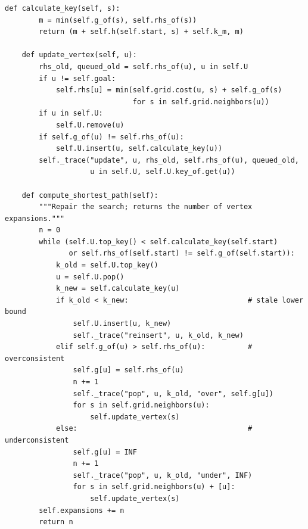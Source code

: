 \begin{lstlisting}[caption={\cref{alg:ch05-dstarlite} line by line: key, \protect\DslUpdateVertex and \protect\DslComputeShortestPath of class \code{DStarLite} (from \code{code/ch05\_dstar\_lite.py}). Missing dictionary entries stand for $\infty$; \code{\_trace} records the events for the worked examples.},label={lst:ch05-core}]
    def calculate_key(self, s):
        m = min(self.g_of(s), self.rhs_of(s))
        return (m + self.h(self.start, s) + self.k_m, m)

    def update_vertex(self, u):
        rhs_old, queued_old = self.rhs_of(u), u in self.U
        if u != self.goal:
            self.rhs[u] = min(self.grid.cost(u, s) + self.g_of(s)
                              for s in self.grid.neighbors(u))
        if u in self.U:
            self.U.remove(u)
        if self.g_of(u) != self.rhs_of(u):
            self.U.insert(u, self.calculate_key(u))
        self._trace("update", u, rhs_old, self.rhs_of(u), queued_old,
                    u in self.U, self.U.key_of.get(u))

    def compute_shortest_path(self):
        """Repair the search; returns the number of vertex expansions."""
        n = 0
        while (self.U.top_key() < self.calculate_key(self.start)
               or self.rhs_of(self.start) != self.g_of(self.start)):
            k_old = self.U.top_key()
            u = self.U.pop()
            k_new = self.calculate_key(u)
            if k_old < k_new:                            # stale lower bound
                self.U.insert(u, k_new)
                self._trace("reinsert", u, k_old, k_new)
            elif self.g_of(u) > self.rhs_of(u):          # overconsistent
                self.g[u] = self.rhs_of(u)
                n += 1
                self._trace("pop", u, k_old, "over", self.g[u])
                for s in self.grid.neighbors(u):
                    self.update_vertex(s)
            else:                                        # underconsistent
                self.g[u] = INF
                n += 1
                self._trace("pop", u, k_old, "under", INF)
                for s in self.grid.neighbors(u) + [u]:
                    self.update_vertex(s)
        self.expansions += n
        return n
\end{lstlisting}

